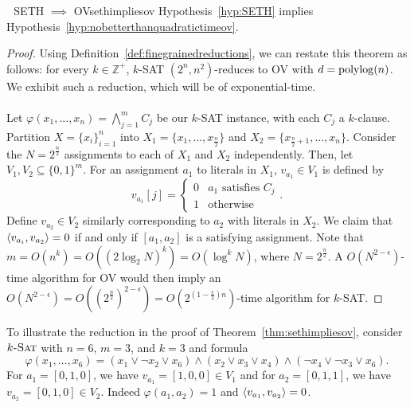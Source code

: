         \begin{theorem}{\Stop\,\,\cite{williams2005twoconstraintsat} SETH \(\implies\) OV}{sethimpliesov}
            Hypothesis~\ref{hyp:SETH} implies Hypothesis~\ref{hyp:nobetterthanquadratictimeov}.
            \begin{proof}
                Using Definition~\ref{def:finegrainedreductions}, we can restate this theorem as follows: for every \(k\in\mathbb{Z}^+\), \(k\)-\textsc{SAT} \((2^n,n^2)\)-reduces to \textsc{OV} with \(d=\operatorname{polylog}(n)\). We exhibit such a reduction, which will be of exponential-time.
                \\
                \\
                Let \(\varphi(x_1,\ldots,x_n)=\bigwedge_{j=1}^m C_j\) be our \(k\)-\textsc{SAT} instance, with each \(C_j\) a \(k\)-clause. Partition \(X=\{x_i\}_{i=1}^n\) into \(X_1=\{x_1,\ldots,x_{\frac{n}{2}}\}\) and \(X_2=\{x_{\frac{n}{2}+1},\ldots,x_n\}\). Consider the \(N=2^\frac{n}{2}\) assignments to each of \(X_1\) and \(X_2\) independently. Then, let \(V_1,V_2\subseteq\{0,1\}^m\). For an assignment \(a_1\) to literals in \(X_1\), \(v_{a_1}\in V_1\) is defined by
                \begin{equation*}
                    v_{a_1}[j]=\begin{cases}
                    0 & a_1\text{ satisfies }C_j \\
                    1 & \text{otherwise}
                    \end{cases}.
                \end{equation*}
                Define \(v_{a_2}\in V_2\) similarly corresponding to \(a_2\) with literals in \(X_2\). We claim that \(\left\langle v_{a_i},v_{a_2}\right\rangle=0\) if and only if \([a_1,a_2]\) is a satisfying assignment. Note that \(m=O(n^k)=O((2\log_2N)^k)=O(\log^kN)\), where \(N=2^\frac{n}{2}\). A \(O\left(N^{2-\epsilon}\right)\)-time algorithm for \textsc{OV} would then imply an \(O\left(N^{2-\epsilon}\right)=O\left(\left(2^\frac{n}{2}\right)^{2-\epsilon}\right)=O\left(2^{\left(1-\frac{\epsilon}{2}\right)n}\right)\)-time algorithm for \(k\)-\textsc{SAT}. 
            \end{proof}
        \end{theorem}
        \begin{example}
            To illustrate the reduction in the proof of Theorem~\ref{thm:sethimpliesov}, consider \(k\textsc{-Sat}\) with \(n=6\), \(m=3\), and \(k=3\) and formula
            \begin{equation*}
                \varphi(x_1,\ldots,x_6)=(x_1\vee\neg x_2\vee x_6)\wedge(x_2\vee x_3\vee x_4)\wedge (\neg x_4\vee \neg x_3\vee x_6).
            \end{equation*}
            For \(a_1=[0,1,0]\), we have \(v_{a_1}=[1,0,0]\in V_1\) and for \(a_2=[0,1,1]\), we have \(v_{a_2}=[0,1,0]\in V_2\). Indeed \(\varphi(a_1,a_2)=1\) and \(\left\langle v_{a_1},v_{a_2}\right\rangle=0\).
        \end{example}

